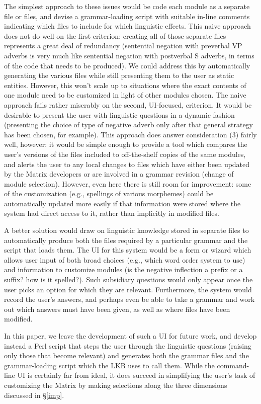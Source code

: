 The simplest approach to these issues would be code each module as a
separate file or files, and devise a grammar-loading script with
suitable in-line comments indicating which files to include for which
linguistic effects.  This naive approach does not do well on the first
criterion: creating all of those separate files represents a great
deal of redundancy (sentential negation with preverbal VP adverbs is
very much like sentential negation with postverbal S adverbs, in terms
of the code that needs to be produced).  We could address this by
automatically generating the various files while still presenting them
to the user as static entities.  However, this won't scale up to
situations where the exact contents of one module need to be
customized in light of other modules chosen.  The naive approach fails
rather miserably on the second, UI-focused, criterion.  It would be
desirable to present the user with linguistic questions in a dynamic
fashion (presenting the choice of type of negative adverb only after
that general strategy has been chosen, for example).  This approach
does answer consideration (3) fairly well, however: it would be simple enough to
provide a tool which compares the user's versions of the files
included to off-the-shelf copies of the same modules, and alerts the
user to any local changes to files which have either been updated by
the Matrix developers or are involved in a grammar revision (change
of module selection).  However, even here there is still room for improvement:
some of the customization (e.g., spellings of various morphemes) could
be automatically updated more easily if that information were stored
where the system had direct access to it, rather than implicitly in
modified files.

A better solution would draw on linguistic knowledge stored in
separate files to automatically produce both the files required by a
particular grammar and the script that loads them.  The UI for this
system would be a form or wizard which allows user input of both
broad choices (e.g., which word order system to use) and information
to customize modules (is the negative inflection a prefix or a suffix?
how is it spelled?).  Such subsidiary questions would only appear once
the user picks an option for which they are relevant. Furthermore, the
system would record the user's answers, and perhaps even be able to
take a grammar and work out which answers must have been given, as
well as where files have been modified.

In this paper, we leave the development of such a UI for future work,
and develop instead a Perl script that steps the
user through the linguistic questions (raising only those that become
relevant) and generates both the grammar files and the grammar-loading
script which the LKB uses to call them.  While the command-line UI is
certainly far from ideal, it does succeed in simplifying the user's task
of customizing the Matrix by making selections along the three dimensions
discussed in \S\ref{imp}.

